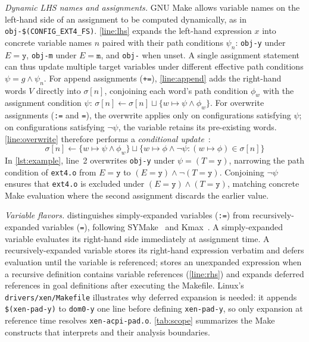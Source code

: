 \documentclass[acmsmall,screen,review,anonymous,nonacm]{acmart}
\begin{document}
  \emph{Dynamic LHS names and assignments.}
  GNU Make allows variable names on the left-hand side of an assignment to be computed dynamically, as in \texttt{obj-\$(CONFIG\_EXT4\_FS)}.
  \autoref{line:lhs} expands the left-hand expression $x$ into concrete variable names $n$ paired with their path conditions $\psi_n$: \texttt{obj-y} under $E = \mathtt{y}$, \texttt{obj-m} under $E = \mathtt{m}$, and \texttt{obj-} when unset.
  A single assignment statement can thus update multiple target variables under different effective path conditions $\psi = g \land \psi_n$.
  For append assignments (\texttt{+=}), \autoref{line:append} adds the right-hand words $V$ directly into $\sigma[n]$, conjoining each word's path condition $\phi_w$ with the assignment condition $\psi$: $\sigma[n] \gets \sigma[n] \sqcup \{w \mapsto \psi \land \phi_w\}$.
  For overwrite assignments (\texttt{:=} and \texttt{=}), the overwrite applies only on configurations satisfying $\psi$; on configurations satisfying $\neg\psi$, the variable retains its pre-existing words.
  \autoref{line:overwrite} therefore performs a \emph{conditional update}~\cite{sen2015multise,gazzillo2017kmax}:
  $$\sigma[n] \gets \{w \mapsto \psi \land \phi_w\} \sqcup \{w \mapsto \phi \land \neg\psi : (w \mapsto \phi) \in \sigma[n]\}$$
  In \autoref{lst:example}, line~2 overwrites \texttt{obj-y} under $\psi = (T = \mathtt{y})$, narrowing the path condition of \texttt{ext4.o} from $E = \mathtt{y}$ to $(E = \mathtt{y}) \land \neg(T = \mathtt{y})$.
  Conjoining $\neg\psi$ ensures that \texttt{ext4.o} is excluded under $(E = \mathtt{y}) \land (T = \mathtt{y})$, matching concrete Make evaluation where the second assignment discards the earlier value.

  \emph{Variable flavors.}
  \tool{} distinguishes simply-expanded variables (\texttt{:=}) from recursively-expanded variables (\texttt{=}), following SYMake~\cite{tamrawi2012symmake} and Kmax~\cite{gazzillo2017kmax}.
  A simply-expanded variable evaluates its right-hand side immediately at assignment time.
  A recursively-expanded variable stores its right-hand expression verbatim and defers evaluation until the variable is referenced; \tool{} stores an unexpanded expression when a recursive definition contains variable references (\autoref{line:rhs}) and expands deferred references in goal definitions after executing the Makefile.
  Linux's \texttt{drivers/xen/Makefile} illustrates why deferred expansion is needed: it appends \texttt{\$(xen-pad-y)} to \texttt{dom0-y} one line before defining \texttt{xen-pad-y}, so only expansion at reference time resolves \texttt{xen-acpi-pad.o}.
  \autoref{tab:scope} summarizes the Make constructs that \tool{} interprets and their analysis boundaries.
\end{document}
